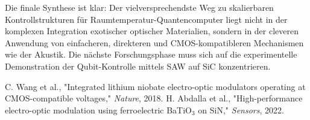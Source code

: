 \documentclass[12pt, a4paper, numbers]{report}
\begin{document}
Die finale Synthese ist klar: Der vielversprechendste Weg zu skalierbaren Kontrollstrukturen für Raumtemperatur-Quantencomputer liegt nicht in der komplexen Integration exotischer optischer Materialien, sondern in der cleveren Anwendung von einfacheren, direkteren und CMOS-kompatibleren Mechanismen wie der Akustik. Die nächste Forschungsphase muss sich auf die experimentelle Demonstration der Qubit-Kontrolle mittels SAW auf SiC konzentrieren.


\begin{thebibliography}{9}
C. Wang et al., "Integrated lithium niobate electro-optic modulators operating at CMOS-compatible voltages," \textit{Nature}, 2018.
H. Abdalla et al., "High-performance electro-optic modulation using ferroelectric BaTiO$_3$ on SiN," \textit{Sensors}, 2022.
\end{thebibliography}

\end{document}
